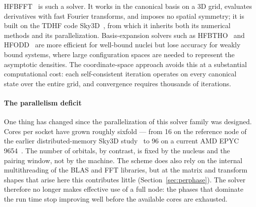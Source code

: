 \documentclass[preprint,12pt]{elsarticle}
\numberwithin{equation}{section}
\begin{document}
HFBFFT~\cite{hfbfft} is such a solver. It works in the canonical basis on a 3D grid, evaluates derivatives with fast Fourier transforms, and imposes no spatial symmetry; it is built on the TDHF code Sky3D~\cite{sky3d}, from which it inherits both its numerical methods and its parallelization. Basis-expansion solvers such as HFBTHO~\cite{hfbtho} and HFODD~\cite{hfodd} are more efficient for well-bound nuclei but lose accuracy for weakly bound systems, where large configuration spaces are needed to represent the asymptotic densities. The coordinate-space approach avoids this at a substantial computational cost: each self-consistent iteration operates on every canonical state over the entire grid, and convergence requires thousands of iterations.

\paragraph{The parallelism deficit}
One thing has changed since the parallelization of this solver family was designed. Cores per socket have grown roughly sixfold --- from 16 on the reference node of the earlier distributed-memory Sky3D study~\cite{sky3dmpi} to 96 on a current AMD EPYC 9654~\cite{amdgenoa}. The number of orbitals, by contrast, is fixed by the nucleus and the pairing window, not by the machine. The scheme does also rely on the internal multithreading of the BLAS and FFT libraries, but at the matrix and transform shapes that arise here this contributes little (Section~\ref{sec:perphase}). The solver therefore no longer makes effective use of a full node: the phases that dominate the run time stop improving well before the available cores are exhausted.
\end{document}
